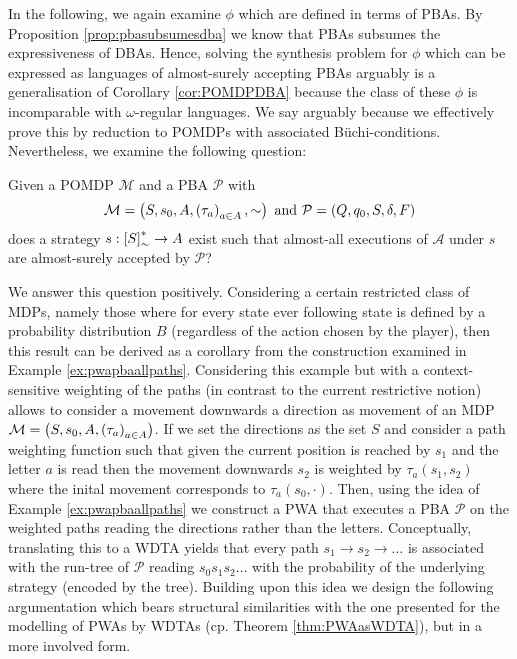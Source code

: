 In the following, we again examine $\phi$ which are defined in terms of
\acp{PBA}. By Proposition \ref{prop:pbasubsumesdba} we know that \acp{PBA}
subsumes the expressiveness of \acp{DBA}. Hence, solving the synthesis problem
for $\phi$ which can be expressed as languages of almost-surely accepting
\acp{PBA} arguably is a generalisation of Corollary \ref{cor:POMDPDBA} because
the class of these $\phi$ is incomparable with $\omega$-regular languages. We
say arguably because we effectively prove this by reduction to \acp{POMDP} with
associated Büchi-conditions. Nevertheless, we examine the following question:
\begin{definition}
  Given a \ac{POMDP} $\mathcal{M}$ and a \ac{PBA} $\mathcal{P}$ with
  \begin{equation*}
    \mathcal{M} = \left(S, s_{0}, A, \left(\tau_{a}\right)_{a\in A}, \sim\right)
  \text{ and }
    \mathcal{P} = \left(Q, q_{0}, S, \delta, F\right)
  \end{equation*}
  does a strategy $s:\left[S\right]_{\sim}^{*}\rightarrow A$ exist such that 
  almost-all executions of $\mathcal{A}$ under $s$ are almost-surely accepted 
  by $\mathcal{P}$?
  \label{def:pbastratsynthesis}
\end{definition}
We answer this question positively. Considering a certain restricted class
of \acp{MDP}, namely those where for every state ever following state is
defined by a probability distribution $B$ (regardless of the action chosen by
the player), then this result can be derived as a corollary from the
construction examined in Example \ref{ex:pwapbaallpaths}. Considering this
example but with a context-sensitive weighting of the paths (in contrast to
the current restrictive notion) allows to consider a movement downwards a
direction as movement of an \ac{MDP} $\mathcal{M} = \left(S, s_{0}, A,
\left(\tau_{a}\right)_{a\in A}\right)$. If we set the directions as the set $S$ and
consider a path weighting function such that given the current position is
reached by $s_{1}$ and the letter $a$ is read then the movement downwards
$s_{2}$ is weighted by $\tau_{a}(s_{1}, s_{2})$ where the inital movement
corresponds to $\tau_{a}(s_{0}, \cdot)$. Then, using the idea of Example
\ref{ex:pwapbaallpaths} we construct a \ac{PWA} that executes a \ac{PBA}
$\mathcal{P}$ on the weighted paths reading the directions rather than the
letters. Conceptually, translating this to a \ac{WDTA} yields that every path
$s_{1}\rightarrow s_{2}\rightarrow\dots$ is associated with the run-tree of
$\mathcal{P}$ reading $s_{0}s_{1}s_{2}\dots$ with the probability of the
underlying strategy (encoded by the tree). Building upon this idea we design
the following argumentation which bears structural similarities with the one
presented for the modelling of \acp{PWA} by \acp{WDTA} (cp. Theorem
\ref{thm:PWAasWDTA}), but in a more involved form.


